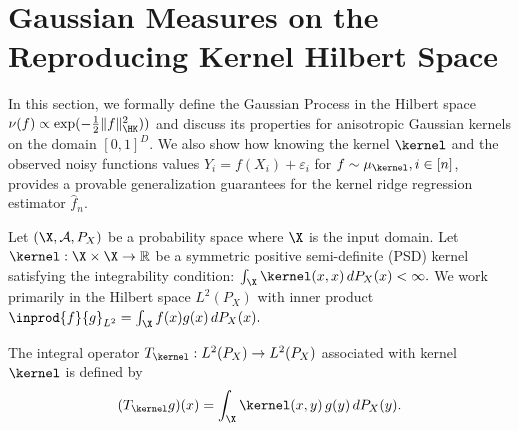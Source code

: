 \documentclass{article}
\begin{document}
\section{Gaussian Measures on the Reproducing Kernel Hilbert Space}\label{sec:gaussian-measure-on-the-rkhs}

In this section, we formally define the Gaussian Process in the Hilbert space $\nu(f) \propto \exp(-\frac{1}{2}\|f\|_{\HK}^2))$ and discuss its properties for anisotropic Gaussian kernels on the domain $[0, 1]^D$. We also show how knowing the kernel $\kernel$ and the observed noisy functions values $Y_i = f(X_i) + \varepsilon_i$ for $f \sim \mu_\kernel, i \in [n]$, provides a provable generalization guarantees for the kernel ridge regression estimator $\hat{f}_n$.






Let $(\X, \mathcal{A}, P_X)$ be a probability space where $\X$ is the input domain. Let $\kernel: \X \times \X \to \R$ be a symmetric positive semi-definite (PSD) kernel satisfying the integrability condition:
$
	\int_{\X} \kernel(x, x) \, dP_X(x) < \infty.
$
We work primarily in the Hilbert space $L^2(P_X)$ with inner product
$
	\inprod{f}{g}_{L^2} = \int_{\X} f(x) g(x) \, dP_X(x).
$


\begin{definition}
	The integral operator $T_\kernel: L^2(P_X) \to L^2(P_X)$ associated with kernel $\kernel$ is defined by
	\begin{equation}
		(T_\kernel g)(x) = \int_{\X} \kernel(x, y) \, g(y) \, dP_X(y).
	\end{equation}
\end{definition}
\end{document}
